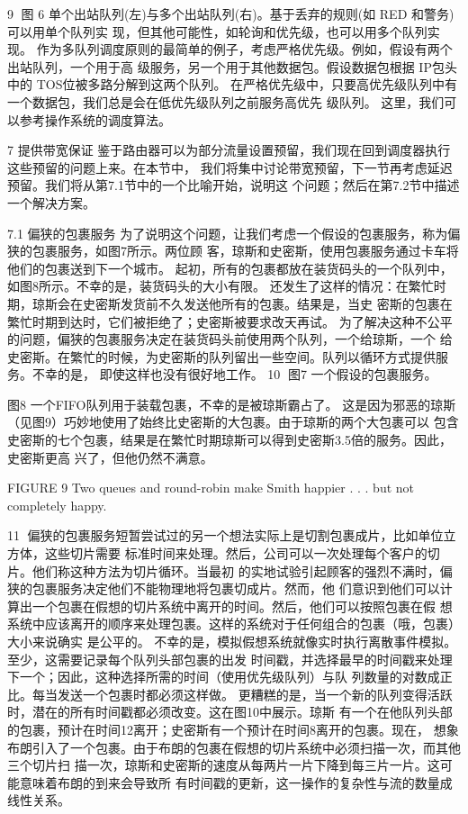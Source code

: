                                                 9
图 6 单个出站队列(左)与多个出站队列(右)。基于丢弃的规则(如 RED 和警务)可以用单个队列实
现，但其他可能性，如轮询和优先级，也可以用多个队列实现。
作为多队列调度原则的最简单的例子，考虑严格优先级。例如，假设有两个出站队列，一个用于高
级服务，另一个用于其他数据包。假设数据包根据 IP包头中的 TOS位被多路分解到这两个队列。
在严格优先级中，只要高优先级队列中有一个数据包，我们总是会在低优先级队列之前服务高优先
级队列。
这里，我们可以参考操作系统的调度算法。

7 提供带宽保证
鉴于路由器可以为部分流量设置预留，我们现在回到调度器执行这些预留的问题上来。在本节中，
我们将集中讨论带宽预留，下一节再考虑延迟预留。我们将从第7.1节中的一个比喻开始，说明这
个问题；然后在第7.2节中描述一个解决方案。

7.1 偏狭的包裹服务
为了说明这个问题，让我们考虑一个假设的包裹服务，称为偏狭的包裹服务，如图7所示。两位顾
客，琼斯和史密斯，使用包裹服务通过卡车将他们的包裹送到下一个城市。
起初，所有的包裹都放在装货码头的一个队列中，如图8所示。不幸的是，装货码头的大小有限。
还发生了这样的情况：在繁忙时期，琼斯会在史密斯发货前不久发送他所有的包裹。结果是，当史
密斯的包裹在繁忙时期到达时，它们被拒绝了；史密斯被要求改天再试。
为了解决这种不公平的问题，偏狭的包裹服务决定在装货码头前使用两个队列，一个给琼斯，一个
给史密斯。在繁忙的时候，为史密斯的队列留出一些空间。队列以循环方式提供服务。不幸的是，
即使这样也没有很好地工作。
                                                10
图7 一个假设的包裹服务。




图8 一个FIFO队列用于装载包裹，不幸的是被琼斯霸占了。
这是因为邪恶的琼斯（见图9）巧妙地使用了始终比史密斯的大包裹。由于琼斯的两个大包裹可以
包含史密斯的七个包裹，结果是在繁忙时期琼斯可以得到史密斯3.5倍的服务。因此，史密斯更高
兴了，但他仍然不满意。




 FIGURE 9 Two queues and round-robin make Smith happier . . . but not completely happy.


                                                                                          11
偏狭的包裹服务短暂尝试过的另一个想法实际上是切割包裹成片，比如单位立方体，这些切片需要
标准时间来处理。然后，公司可以一次处理每个客户的切片。他们称这种方法为切片循环。当最初
的实地试验引起顾客的强烈不满时，偏狭的包裹服务决定他们不能物理地将包裹切成片。然而，他
们意识到他们可以计算出一个包裹在假想的切片系统中离开的时间。然后，他们可以按照包裹在假
想系统中应该离开的顺序来处理包裹。这样的系统对于任何组合的包裹（哦，包裹）大小来说确实
是公平的。
不幸的是，模拟假想系统就像实时执行离散事件模拟。至少，这需要记录每个队列头部包裹的出发
时间戳，并选择最早的时间戳来处理下一个；因此，这种选择所需的时间（使用优先级队列）与队
列数量的对数成正比。每当发送一个包裹时都必须这样做。
更糟糕的是，当一个新的队列变得活跃时，潜在的所有时间戳都必须改变。这在图10中展示。琼斯
有一个在他队列头部的包裹，预计在时间12离开；史密斯有一个预计在时间8离开的包裹。现在，
想象布朗引入了一个包裹。由于布朗的包裹在假想的切片系统中必须扫描一次，而其他三个切片扫
描一次，琼斯和史密斯的速度从每两片一片下降到每三片一片。这可能意味着布朗的到来会导致所
有时间戳的更新，这一操作的复杂性与流的数量成线性关系。


